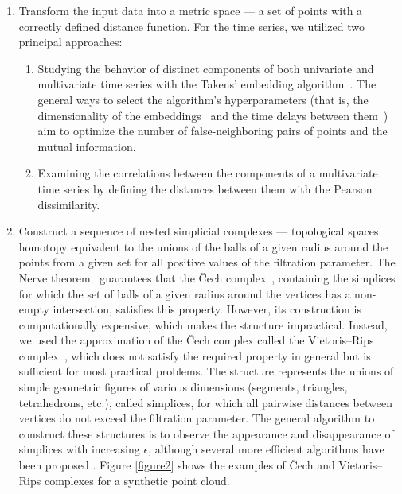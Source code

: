 \documentclass[10pt,lettersize,journal]{IEEEtran}
\begin{document}
\begin{enumerate}
    \item
        Transform the input data into a metric space --- a set of points with a correctly defined distance function. For the time series, we utilized two principal approaches:
        \begin{enumerate}
            \item
                Studying the behavior of distinct components of both univariate and multivariate time series with the Takens' embedding algorithm~\cite{10.1007/BFb0091924,perea2013slidingwindowspersistenceapplication}. The general ways to select the algorithm's hyperparameters (that is, the dimensionality of the embeddings~\cite{PhysRevA.45.3403} and the time delays between them~\cite{PhysRevA.33.1134}) aim to optimize the number of false-neighboring pairs of points and the mutual information.
            \item 
                Examining the correlations between the components of a multivariate time series by defining the distances between them with the Pearson dissimilarity.
        \end{enumerate}
    \item 
        Construct a sequence of nested simplicial complexes --- topological spaces homotopy equivalent to the unions of the balls of a given radius around the points from a given set for all positive values of the filtration parameter. The Nerve theorem~\cite{Borsuk1948} guarantees that the \v{C}ech complex~\cite{Cech1932}, containing the simplices for which the set of balls of a given radius around the vertices has a non-empty intersection, satisfies this property. However, its construction is computationally expensive, which makes the structure impractical. Instead, we used the approximation of the \v{C}ech complex called the Vietoris--Rips complex~\cite{Vietoris1927}, which does not satisfy the required property in general but is sufficient for most practical problems. The structure represents the unions of simple geometric figures of various dimensions (segments, triangles, tetrahedrons, etc.), called simplices, for which all pairwise distances between vertices do not exceed the filtration parameter. The general algorithm to construct these structures is to observe the appearance and disappearance of simplices with increasing $\epsilon$, although several more efficient algorithms have been proposed \cite{ZOMORODIAN2010263,rieser2024newconstructionvietorisripscomplex,Bauer_2021}. Figure \ref{figure2} shows the examples of \v{C}ech and Vietoris--Rips complexes for a synthetic point cloud.

\end{enumerate}
\end{document}
